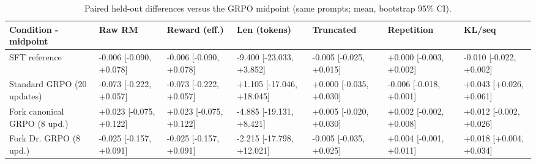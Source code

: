 \begin{table}[t]
\centering
\small
\caption{Paired held-out differences versus the GRPO midpoint (same prompts; mean, bootstrap 95\% CI).}
\begin{tabular}{lllllll}
\toprule
Condition - midpoint & Raw RM & Reward (eff.) & Len (tokens) & Truncated & Repetition & KL/seq \\
\midrule
SFT reference & -0.006 [-0.090, +0.078] & -0.006 [-0.090, +0.078] & -9.400 [-23.033, +3.852] & -0.005 [-0.025, +0.015] & +0.000 [-0.003, +0.002] & -0.010 [-0.022, +0.002] \\
Standard GRPO (20 updates) & -0.073 [-0.222, +0.057] & -0.073 [-0.222, +0.057] & +1.105 [-17.046, +18.045] & +0.000 [-0.035, +0.030] & -0.006 [-0.018, +0.001] & +0.043 [+0.026, +0.061] \\
Fork canonical GRPO (8 upd.) & +0.023 [-0.075, +0.122] & +0.023 [-0.075, +0.122] & -4.885 [-19.131, +8.421] & +0.005 [-0.020, +0.030] & +0.002 [-0.002, +0.008] & +0.012 [-0.002, +0.026] \\
Fork Dr. GRPO (8 upd.) & -0.025 [-0.157, +0.091] & -0.025 [-0.157, +0.091] & -2.215 [-17.798, +12.021] & -0.005 [-0.035, +0.025] & +0.004 [-0.001, +0.011] & +0.018 [+0.004, +0.034] \\
\bottomrule
\end{tabular}
\end{table}
